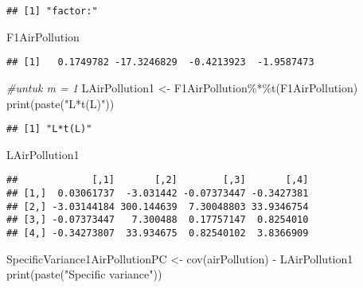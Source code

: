 \documentclass[
]{article}
\newenvironment{Shaded}{\begin{snugshade}}{\end{snugshade}}
\newcommand{\CommentTok}[1]{\textcolor[rgb]{0.56,0.35,0.01}{\textit{#1}}}
\newcommand{\FunctionTok}[1]{\textcolor[rgb]{0.00,0.00,0.00}{#1}}
\newcommand{\NormalTok}[1]{#1}
\newcommand{\OtherTok}[1]{\textcolor[rgb]{0.56,0.35,0.01}{#1}}
\newcommand{\SpecialCharTok}[1]{\textcolor[rgb]{0.00,0.00,0.00}{#1}}
\newcommand{\StringTok}[1]{\textcolor[rgb]{0.31,0.60,0.02}{#1}}
\begin{document}
\begin{verbatim}
## [1] "factor:"
\end{verbatim}

\begin{Shaded}
\begin{Highlighting}[]
\NormalTok{F1AirPollution}
\end{Highlighting}
\end{Shaded}

\begin{verbatim}
## [1]   0.1749782 -17.3246829  -0.4213923  -1.9587473
\end{verbatim}

\begin{Shaded}
\begin{Highlighting}[]
\CommentTok{\#untuk m = 1}
\NormalTok{LAirPollution1 }\OtherTok{\textless{}{-}}\NormalTok{ F1AirPollution}\SpecialCharTok{\%*\%}\FunctionTok{t}\NormalTok{(F1AirPollution)}
\FunctionTok{print}\NormalTok{(}\FunctionTok{paste}\NormalTok{(}\StringTok{"L*t(L)"}\NormalTok{))}
\end{Highlighting}
\end{Shaded}

\begin{verbatim}
## [1] "L*t(L)"
\end{verbatim}

\begin{Shaded}
\begin{Highlighting}[]
\NormalTok{LAirPollution1}
\end{Highlighting}
\end{Shaded}

\begin{verbatim}
##             [,1]       [,2]        [,3]       [,4]
## [1,]  0.03061737  -3.031442 -0.07373447 -0.3427381
## [2,] -3.03144184 300.144639  7.30048803 33.9346754
## [3,] -0.07373447   7.300488  0.17757147  0.8254010
## [4,] -0.34273807  33.934675  0.82540102  3.8366909
\end{verbatim}

\begin{Shaded}
\begin{Highlighting}[]
\NormalTok{SpecificVariance1AirPollutionPC }\OtherTok{\textless{}{-}} \FunctionTok{cov}\NormalTok{(airPollution) }\SpecialCharTok{{-}}\NormalTok{ LAirPollution1}
\FunctionTok{print}\NormalTok{(}\FunctionTok{paste}\NormalTok{(}\StringTok{"Specific variance"}\NormalTok{))}
\end{Highlighting}
\end{Shaded}
\end{document}
